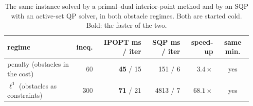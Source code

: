 \begin{table}[htbp]
  \centering
  \small
  \caption{The same instance solved by a primal--dual interior-point method and by an SQP with an active-set QP solver, in both obstacle regimes. Both are started cold. Bold: the faster of the two.}
  \label{res:tab:solvercmp}
  \begin{tabular}{lrrrrc}
    \toprule
    regime & ineq. & IPOPT ms / iter & SQP ms / iter & speed-up & same min. \\
    \midrule
    penalty (obstacles in the cost) & 60 & \textbf{45} / 15 & 151 / 6 & $3.4\times$ & yes \\
    $\ell^1$ (obstacles as constraints) & 300 & \textbf{71} / 21 & 4813 / 7 & $68.1\times$ & yes \\
    \bottomrule
  \end{tabular}
\end{table}


